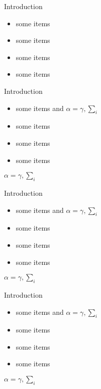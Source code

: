 \documentclass{beamer}
\begin{document}
\begin{frame}{}
\begin{columns}[T]
\begin{column}{.48\linewidth}
\begin{block}{Introduction}
\begin{itemize}
\item some items
\item some items
\item some items
\item some items
\end{itemize}
\end{block}
\begin{block}{Introduction}
\begin{itemize}
\item some items and $\alpha=\gamma, \sum_{i}$
\item some items
\item some items
\item some items
\end{itemize}
$\alpha=\gamma, \sum_{i}$
\end{block}
\begin{block}{Introduction}
\begin{itemize}
\item some items and $\alpha=\gamma, \sum_{i}$
\item some items
\item some items
\item some items
\end{itemize}
$\alpha=\gamma, \sum_{i}$
\end{block}

\begin{block}{Introduction}
\begin{itemize}
\item some items and $\alpha=\gamma, \sum_{i}$
\item some items
\item some items
\item some items
\end{itemize}
$\alpha=\gamma, \sum_{i}$
\end{block}
\end{column}
\end{columns}
\end{frame}
\end{document}
